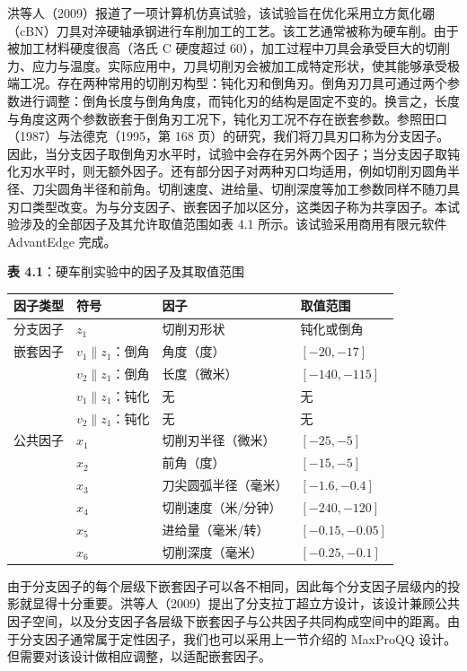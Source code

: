 \documentclass{ctexart}
\begin{document}
洪等人（2009）报道了一项计算机仿真试验，该试验旨在优化采用立方氮化硼（cBN）刀具对淬硬轴承钢进行车削加工的工艺。该工艺通常被称为硬车削。由于被加工材料硬度很高（洛氏 C 硬度超过 60），加工过程中刀具会承受巨大的切削力、应力与温度。实际应用中，刀具切削刃会被加工成特定形状，使其能够承受极端工况。存在两种常用的切削刃构型：钝化刃和倒角刃。倒角刃刀具可通过两个参数进行调整：倒角长度与倒角角度，而钝化刃的结构是固定不变的。换言之，长度与角度这两个参数嵌套于倒角刃工况下，钝化刃工况不存在嵌套参数。参照田口（1987）与法德克（1995，第 168 页）的研究，我们将刀具刃口称为分支因子。因此，当分支因子取倒角刃水平时，试验中会存在另外两个因子；当分支因子取钝化刃水平时，则无额外因子。还有部分因子对两种刃口均适用，例如切削刃圆角半径、刀尖圆角半径和前角。切削速度、进给量、切削深度等加工参数同样不随刀具刃口类型改变。为与分支因子、嵌套因子加以区分，这类因子称为共享因子。本试验涉及的全部因子及其允许取值范围如表 4.1 所示。该试验采用商用有限元软件 AdvantEdge 完成。

\begin{mdquote}
\textbf{表 4.1}：硬车削实验中的因子及其取值范围
\end{mdquote}

\begin{table}[htbp]
\begin{tabular}{l|l|l|l}
\hline
因子类型 & 符号 & 因子 & 取值范围 \\
\hline
分支因子 & $z_1$ & 切削刃形状 & 钝化或倒角 \\
嵌套因子 & $v_1\|z_1$：倒角 & 角度（度） & $[-20,-17]$ \\
 & $v_2\|z_1$：倒角 & 长度（微米） & $[-140,-115]$ \\
 & $v_1\|z_1$：钝化 & 无 & 无 \\
 & $v_2\|z_1$：钝化 & 无 & 无 \\
公共因子 & $x_1$ & 切削刃半径（微米） & $[-25,-5]$ \\
 & $x_2$ & 前角（度） & $[-15,-5]$ \\
 & $x_3$ & 刀尖圆弧半径（毫米） & $[-1.6,-0.4]$ \\
 & $x_4$ & 切削速度（米/分钟） & $[-240,-120]$ \\
 & $x_5$ & 进给量（毫米/转） & $[-0.15,-0.05]$ \\
 & $x_6$ & 切削深度（毫米） & $[-0.25,-0.1]$ \\
\hline
\end{tabular}
\end{table}

由于分支因子的每个层级下嵌套因子可以各不相同，因此每个分支因子层级内的投影就显得十分重要。洪等人（2009）提出了分支拉丁超立方设计，该设计兼顾公共因子空间，以及分支因子各层级下嵌套因子与公共因子共同构成空间中的距离。由于分支因子通常属于定性因子，我们也可以采用上一节介绍的 MaxProQQ 设计。但需要对该设计做相应调整，以适配嵌套因子。
\end{document}
